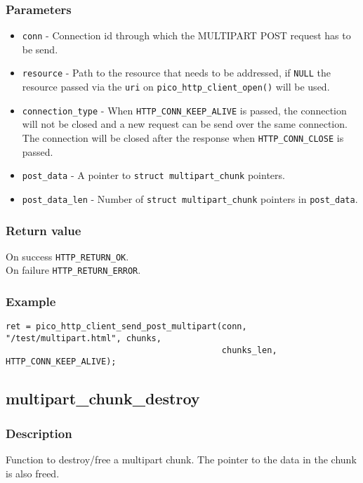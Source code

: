 \subsubsection*{Parameters}
\begin{itemize}[noitemsep]
\item \texttt{conn} - Connection id through which the MULTIPART POST request has to be send.
\item \texttt{resource} - Path to the resource that needs to be addressed, if \texttt{NULL} the resource passed via the \texttt{uri} on \texttt{pico\_http\_client\_open()} will be used.
\item \texttt{connection\_type} - When \texttt{HTTP\_CONN\_KEEP\_ALIVE} is passed, the connection will not be closed and a new request can be send over the same connection. The connection will be closed after the response when \texttt{HTTP\_CONN\_CLOSE} is passed.
\item \texttt{post\_data} - A pointer to \texttt{struct multipart\_chunk} pointers.
\item \texttt{post\_data\_len} - Number of \texttt{struct multipart\_chunk} pointers in \texttt{post\_data}.
\end{itemize}
\subsubsection*{Return value}
On success \texttt{HTTP\_RETURN\_OK}.
\\On failure \texttt{HTTP\_RETURN\_ERROR}.
\subsubsection*{Example}
\begin{verbatim}
ret = pico_http_client_send_post_multipart(conn, "/test/multipart.html", chunks,
                                           chunks_len, HTTP_CONN_KEEP_ALIVE);
\end{verbatim}


\subsection{multipart\_chunk\_destroy}

\subsubsection*{Description}
Function to destroy/free a multipart chunk. The pointer to the data in the chunk is also freed.

